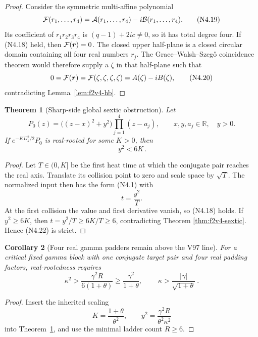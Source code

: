 \documentclass[11pt]{article}
\newtheorem{theorem}{Theorem}[section]
\newtheorem{corollary}[theorem]{Corollary}
\theoremstyle{definition}
\theoremstyle{remark}
\begin{document}
\begin{proof}
Consider the symmetric multi-affine polynomial
\[
 {\cal F}(r_1,\ldots,r_4)
 ={\cal A}(r_1,\ldots,r_4)-i{\cal B}(r_1,\ldots,r_4).
 \tag{N4.19}
\]
Its coefficient of \(r_1r_2r_3r_4\) is
\((q-1)+2ic\ne0\), so it has total degree four.  If
\textup{(N4.18)} held, then \({\cal F}(\boldsymbol r)=0\).
The closed upper half-plane is a closed circular domain containing all four
real numbers \(r_j\).  The Grace--Walsh--Szeg\H{o} coincidence theorem
would therefore supply a \(\zeta\) in that half-plane such that
\[
 0={\cal F}(\boldsymbol r)
   ={\cal F}(\zeta,\zeta,\zeta,\zeta)
   =A(\zeta)-iB(\zeta),
 \tag{N4.20}
\]
contradicting Lemma~\ref{lem:f2v4-hb}.
\end{proof}

\begin{theorem}[Sharp-side global sextic obstruction]
\label{thm:f2v4-global}
Let
\[
 P_0(z)=\bigl((z-x)^2+y^2\bigr)\prod_{j=1}^{4}(z-a_j),
 \qquad x,y,a_j\in\mathbb R,\quad y>0.
 \tag{N4.21}
\]
If \(e^{-KD_z^2/2}P_0\) is real-rooted for some \(K>0\), then
\[
 \boxed{\,y^2<6K\,}.
 \tag{N4.22}
\]
\end{theorem}

\begin{proof}
Let \(T\in(0,K]\) be the first heat time at which the conjugate pair reaches
the real axis.  Translate its collision point to zero and scale space by
\(\sqrt T\).  The normalized input then has the form \textup{(N4.1)} with
\[
 t=\frac{y^2}{T}.
 \tag{N4.23}
\]
At the first collision the value and first derivative vanish, so
\textup{(N4.18)} holds.  If \(y^2\ge6K\), then
\(t=y^2/T\ge6K/T\ge6\), contradicting Theorem
\ref{thm:f2v4-sextic}.  Hence \textup{(N4.22)} is strict.
\end{proof}

\begin{corollary}[Four real gamma padders remain above the V97 line]
\label{cor:f2v4-gamma}
For a critical fixed gamma block with one conjugate target pair and four
real padding factors, real-rootedness requires
\[
 \kappa^2>
 \frac{\gamma^2R}{6(1+\theta)}
 \ge \frac{\gamma^2}{1+\theta},
 \qquad
 \boxed{\ \kappa>\frac{|\gamma|}{\sqrt{1+\theta}}\ }.
 \tag{N4.24}
\]
\end{corollary}

\begin{proof}
Insert the inherited scaling
\[
 K=\frac{1+\theta}{\theta^2},\qquad
 y^2=\frac{\gamma^2R}{\theta^2\kappa^2}
 \tag{N4.25}
\]
into Theorem~\ref{thm:f2v4-global}, and use the minimal ladder count
\(R\ge6\).
\end{proof}
\end{document}
